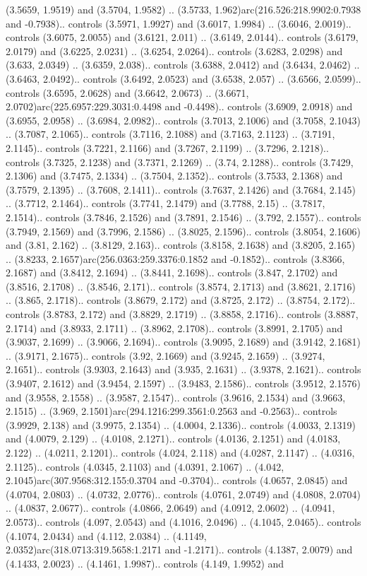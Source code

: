 (3.5659, 1.9519) and (3.5704, 1.9582) .. (3.5733, 1.962)arc(216.526:218.9902:0.7938 and -0.7938).. controls (3.5971, 1.9927) and (3.6017, 1.9984) .. (3.6046, 2.0019).. controls (3.6075, 2.0055) and (3.6121, 2.011) .. (3.6149, 2.0144).. controls (3.6179, 2.0179) and (3.6225, 2.0231) .. (3.6254, 2.0264).. controls (3.6283, 2.0298) and (3.633, 2.0349) .. (3.6359, 2.038).. controls (3.6388, 2.0412) and (3.6434, 2.0462) .. (3.6463, 2.0492).. controls (3.6492, 2.0523) and (3.6538, 2.057) .. (3.6566, 2.0599).. controls (3.6595, 2.0628) and (3.6642, 2.0673) .. (3.6671, 2.0702)arc(225.6957:229.3031:0.4498 and -0.4498).. controls (3.6909, 2.0918) and (3.6955, 2.0958) .. (3.6984, 2.0982).. controls (3.7013, 2.1006) and (3.7058, 2.1043) .. (3.7087, 2.1065).. controls (3.7116, 2.1088) and (3.7163, 2.1123) .. (3.7191, 2.1145).. controls (3.7221, 2.1166) and (3.7267, 2.1199) .. (3.7296, 2.1218).. controls (3.7325, 2.1238) and (3.7371, 2.1269) .. (3.74, 2.1288).. controls (3.7429, 2.1306) and (3.7475, 2.1334) .. (3.7504, 2.1352).. controls (3.7533, 2.1368) and (3.7579, 2.1395) .. (3.7608, 2.1411).. controls (3.7637, 2.1426) and (3.7684, 2.145) .. (3.7712, 2.1464).. controls (3.7741, 2.1479) and (3.7788, 2.15) .. (3.7817, 2.1514).. controls (3.7846, 2.1526) and (3.7891, 2.1546) .. (3.792, 2.1557).. controls (3.7949, 2.1569) and (3.7996, 2.1586) .. (3.8025, 2.1596).. controls (3.8054, 2.1606) and (3.81, 2.162) .. (3.8129, 2.163).. controls (3.8158, 2.1638) and (3.8205, 2.165) .. (3.8233, 2.1657)arc(256.0363:259.3376:0.1852 and -0.1852).. controls (3.8366, 2.1687) and (3.8412, 2.1694) .. (3.8441, 2.1698).. controls (3.847, 2.1702) and (3.8516, 2.1708) .. (3.8546, 2.171).. controls (3.8574, 2.1713) and (3.8621, 2.1716) .. (3.865, 2.1718).. controls (3.8679, 2.172) and (3.8725, 2.172) .. (3.8754, 2.172).. controls (3.8783, 2.172) and (3.8829, 2.1719) .. (3.8858, 2.1716).. controls (3.8887, 2.1714) and (3.8933, 2.1711) .. (3.8962, 2.1708).. controls (3.8991, 2.1705) and (3.9037, 2.1699) .. (3.9066, 2.1694).. controls (3.9095, 2.1689) and (3.9142, 2.1681) .. (3.9171, 2.1675).. controls (3.92, 2.1669) and (3.9245, 2.1659) .. (3.9274, 2.1651).. controls (3.9303, 2.1643) and (3.935, 2.1631) .. (3.9378, 2.1621).. controls (3.9407, 2.1612) and (3.9454, 2.1597) .. (3.9483, 2.1586).. controls (3.9512, 2.1576) and (3.9558, 2.1558) .. (3.9587, 2.1547).. controls (3.9616, 2.1534) and (3.9663, 2.1515) .. (3.969, 2.1501)arc(294.1216:299.3561:0.2563 and -0.2563).. controls (3.9929, 2.138) and (3.9975, 2.1354) .. (4.0004, 2.1336).. controls (4.0033, 2.1319) and (4.0079, 2.129) .. (4.0108, 2.1271).. controls (4.0136, 2.1251) and (4.0183, 2.122) .. (4.0211, 2.1201).. controls (4.024, 2.118) and (4.0287, 2.1147) .. (4.0316, 2.1125).. controls (4.0345, 2.1103) and (4.0391, 2.1067) .. (4.042, 2.1045)arc(307.9568:312.155:0.3704 and -0.3704).. controls (4.0657, 2.0845) and (4.0704, 2.0803) .. (4.0732, 2.0776).. controls (4.0761, 2.0749) and (4.0808, 2.0704) .. (4.0837, 2.0677).. controls (4.0866, 2.0649) and (4.0912, 2.0602) .. (4.0941, 2.0573).. controls (4.097, 2.0543) and (4.1016, 2.0496) .. (4.1045, 2.0465).. controls (4.1074, 2.0434) and (4.112, 2.0384) .. (4.1149, 2.0352)arc(318.0713:319.5658:1.2171 and -1.2171).. controls (4.1387, 2.0079) and (4.1433, 2.0023) .. (4.1461, 1.9987).. controls (4.149, 1.9952) and 